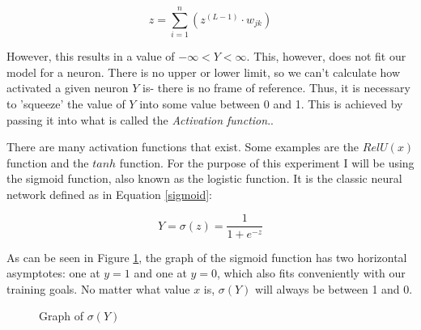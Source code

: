 \documentclass[12pt]{article}
\begin{document}
        \begin{equation} \label{forwardpropequation}
            z = \sum_{i=1}^{n}(z^{(L-1)} \cdot  w_{jk})
        \end{equation}
        
        However, this results in a value of \begin{math} -\infty < Y < \infty \end{math}. This, however, does not fit our model for a neuron. There is no upper or lower limit, so we can't calculate how activated a given neuron \(Y\) is- there is no frame of reference. Thus, it is necessary to 'squeeze' the value of \(Y\) into some value between 0 and 1. This is achieved by passing it into what is called the \textit{Activation function}.\textcite{sharma2017}.

        There are many activation functions that exist. Some examples are the \(RelU(x)\) function and the \(tanh\) function. For the purpose of this experiment I will be using the sigmoid function, also known as the logistic function. It is the classic neural network \textcite{DeepLearningCh2} defined as in Equation \ref{sigmoid}:

        \begin{equation} \label{sigmoid} 
            Y = \sigma(z) = \frac{1}{1 + e ^ {-z}}
        \end{equation}
        
        
        As can be seen in Figure \ref{sigmoidgraph}, the graph of the sigmoid function has two horizontal asymptotes: one at \(y = 1\) and one at \(y = 0\), which also fits conveniently with our training goals. No matter what value $x$ is, \(\sigma(Y)\) will always be between 1 and 0.

        \begin{figure}[h]
            \centering
            \caption{Graph of $\sigma(Y)$} \label{sigmoidgraph}
        \end{figure}
\end{document}
